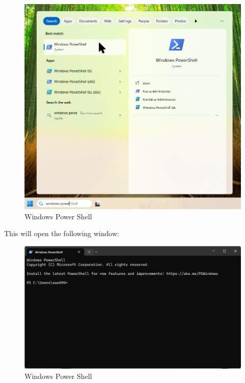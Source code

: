 \documentclass[
  letterpaper,
  DIV=11,
  numbers=noendperiod]{scrreprt}
\begin{document}
\begin{figure}[H]

{\centering \includegraphics[width=6.25in,height=\textheight]{media/amcat-2.1.2_10.png}

}

\caption{Windows Power Shell}

\end{figure}%

This will open the following window:

\begin{figure}[H]

{\centering \includegraphics[width=6.25in,height=\textheight]{media/amcat-2.1.2_11.png}

}

\caption{Windows Power Shell}

\end{figure}%
\end{document}
